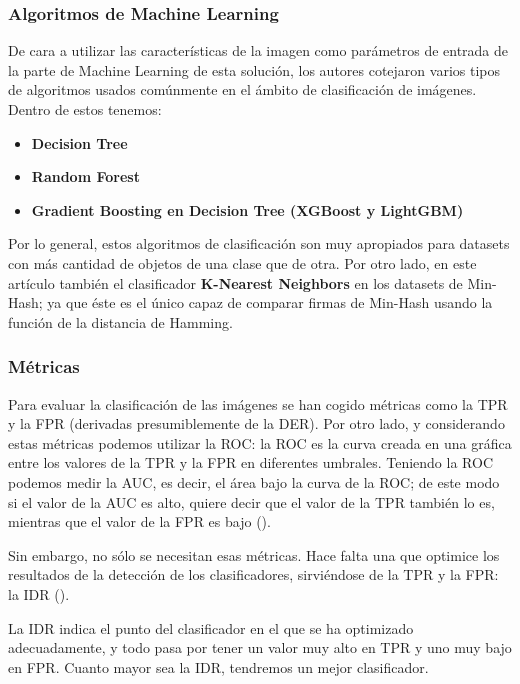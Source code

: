 \subsubsection{Algoritmos de Machine Learning}

De cara a utilizar las características de la imagen como parámetros de entrada de la parte de Machine Learning de esta solución, los autores cotejaron varios tipos de algoritmos usados comúnmente en el ámbito de clasificación de imágenes. Dentro de estos tenemos:

\begin{itemize}
\item \textbf{Decision Tree}
\item \textbf{Random Forest}
\item \textbf{Gradient Boosting en Decision Tree (XGBoost y LightGBM)}
\end{itemize}

Por lo general, estos algoritmos de clasificación son muy apropiados para datasets con más cantidad de objetos de una clase que de otra. Por otro lado, en este artículo también el clasificador \textbf{K-Nearest Neighbors} en los datasets de Min-Hash; ya que éste es el único capaz de comparar firmas de Min-Hash usando la función de la distancia de Hamming.

\subsubsection{Métricas}

Para evaluar la clasificación de las imágenes se han cogido métricas como la \ac{TPR} y la \ac{FPR} (derivadas presumiblemente de la \ac{DER}). Por otro lado, y considerando estas métricas podemos utilizar la \ac{ROC}: la \ac{ROC} es la curva creada en una gráfica entre los valores de la \ac{TPR} y la \ac{FPR} en diferentes umbrales. Teniendo la \ac{ROC} podemos medir la \ac{AUC}, es decir, el área bajo la curva de la \ac{ROC}; de este modo si el valor de la \ac{AUC} es alto, quiere decir que el valor de la \ac{TPR} también lo es, mientras que el valor de la \ac{FPR} es bajo (\cite{auc}). %

Sin embargo, no sólo se necesitan esas métricas. Hace falta una que optimice los resultados de la detección de los clasificadores, sirviéndose de la \ac{TPR} y la \ac{FPR}: la \ac{IDR} (\cite{idr}). %


La \ac{IDR} indica el punto del clasificador en el que se ha optimizado adecuadamente, y todo pasa por tener un valor muy alto en \ac{TPR} y uno muy bajo en \ac{FPR}. Cuanto mayor sea la \ac{IDR}, tendremos un mejor clasificador.

